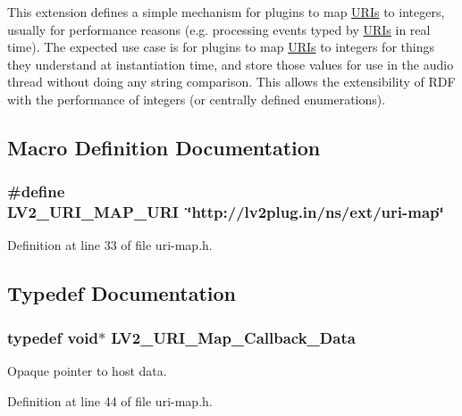 This extension defines a simple mechanism for plugins to map \hyperlink{struct_u_r_is}{U\+R\+Is} to integers, usually for performance reasons (e.\+g. processing events typed by \hyperlink{struct_u_r_is}{U\+R\+Is} in real time). The expected use case is for plugins to map \hyperlink{struct_u_r_is}{U\+R\+Is} to integers for things they \textquotesingle{}understand\textquotesingle{} at instantiation time, and store those values for use in the audio thread without doing any string comparison. This allows the extensibility of R\+DF with the performance of integers (or centrally defined enumerations). 

\subsection{Macro Definition Documentation}
\subsubsection[{\texorpdfstring{L\+V2\+\_\+\+U\+R\+I\+\_\+\+M\+A\+P\+\_\+\+U\+RI}{LV2_URI_MAP_URI}}]{\setlength{\rightskip}{0pt plus 5cm}\#define L\+V2\+\_\+\+U\+R\+I\+\_\+\+M\+A\+P\+\_\+\+U\+RI~\char`\"{}http\+://{\bf lv2plug.\+in}/{\bf ns}/ext/{\bf uri}-\/{\bf map}\char`\"{}}\hypertarget{uri-map_8h_af33637fe4fc667b1e864fe5cb54eb1d7}{}\label{uri-map_8h_af33637fe4fc667b1e864fe5cb54eb1d7}


Definition at line 33 of file uri-\/map.\+h.



\subsection{Typedef Documentation}
\subsubsection[{\texorpdfstring{L\+V2\+\_\+\+U\+R\+I\+\_\+\+Map\+\_\+\+Callback\+\_\+\+Data}{LV2_URI_Map_Callback_Data}}]{\setlength{\rightskip}{0pt plus 5cm}typedef {\bf void}$\ast$ {\bf L\+V2\+\_\+\+U\+R\+I\+\_\+\+Map\+\_\+\+Callback\+\_\+\+Data}}\hypertarget{uri-map_8h_adbac08f0bf00040db3c0298270df0c62}{}\label{uri-map_8h_adbac08f0bf00040db3c0298270df0c62}
Opaque pointer to host data. 

Definition at line 44 of file uri-\/map.\+h.

